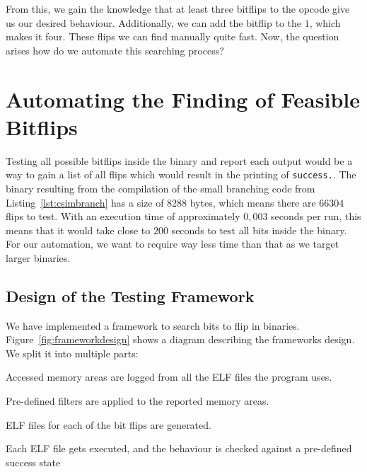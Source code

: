 From this, we gain the knowledge that at least three bitflips to the opcode give
us our desired behaviour. Additionally, we can add the bitflip to the $1$, which
makes it four. These flips we can find manually quite fast. Now, the question
arises how do we automate this searching process?

\section{Automating the Finding of Feasible Bitflips}

Testing all possible bitflips inside the binary and report each output would be
a way to gain a list of all flips which would result in the printing of
\texttt{success.}. The binary resulting from the compilation of the small
branching code from Listing~\ref{lst:csimbranch} has a size of $8288$ bytes,
which means there are $66304$ flips to test. With an execution time of
approximately $0,003$ seconds per run, this means that it would take close to
$200$ seconds to test all bits inside the binary. For our automation, we want
to require way less time than that as we target larger binaries.

\subsection{Design of the Testing Framework}

We have implemented a framework to search bits to flip in binaries.
Figure~\ref{fig:frameworkdesign} shows a diagram describing the
framework\textquotesingle s design. We split it into multiple parts:

\begin{enumerate}
\begin{samepage}
  \item Accessed memory areas are logged from all the ELF files the program
uses.
  \item Pre-defined filters are applied to the reported memory areas.
  \item ELF files for each of the bit flips are generated.
  \item Each ELF file gets executed, and the behaviour is checked against a
pre-defined success state
\end{samepage}
\end{enumerate}

